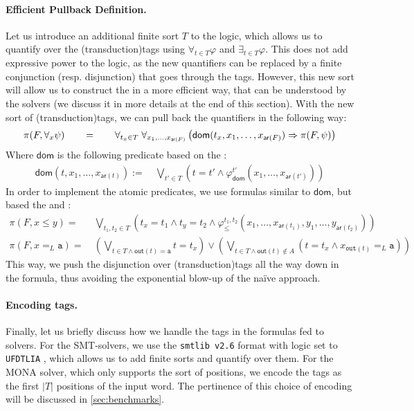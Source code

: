 \paragraph{Efficient Pullback Definition.} Let us introduce an additional
finite sort $T$ to the logic, which allows us to quantify over the \kl(transduction){tags} using
$\forall_{t \in T} \varphi$ and $\exists_{t \in T} \varphi$. This does not add
expressive power to the logic, as the new quantifiers can be replaced by a
finite conjunction (resp. disjunction) that goes through the tags. However,
this new sort will allow us to construct the  in a more
efficient way, that can be understood by the solvers (we discuss it in more
details at the end of this section). With the new sort of \kl(transduction){tags}, we can
pull back the quantifiers in the following way: 
\[ 
\begin{tabular}{ccc}
   $ \pi(F, \forall_{x} \psi)$ & $\quad = \quad$ & $\forall_{t_x \in T} \; \forall_{x_1, \ldots, x_{\mathsf{ar}(F)}} \left( {\mathsf{dom}}(t_x, x_1, \ldots, x_{\mathsf{ar}(F)}) \Rightarrow \pi(F, \psi)\right)$
\end{tabular}
\]
Where $\mathsf{dom}$ is the following predicate based on 
the :
\begin{align*}
    \mathsf{dom}(t, x_1, \ldots, x_{\mathsf{ar}(t)}) :=&~ \bigvee_{t' \in T} \left( t = t' \wedge \varphi_{\mathsf{dom}}^{t'}(x_1, \ldots, x_{\mathsf{ar}(t')}) \right)
\end{align*}
In order to implement the atomic predicates,
we use  formulas similar to $\mathsf{dom}$, but based the  and :
\begin{align*}
   \pi(F, x \leq y)  =&~ \bigvee_{t_1, t_2 \in T} \left( t_x = t_1 \wedge t_y = t_2 \wedge \varphi_{\leq}^{t_1, t_2}(x_1, \ldots, x_{\mathsf{ar}(t_1)}, y_1, \ldots, y_{\mathsf{ar}(t_2)}) \right) \\
   \pi(F, x =_L \mathtt{a}) =&~ \left(\bigvee_{t \in T \wedge \mathsf{out}(t) = \mathtt{a}} t = t_x\right) \vee
\left(\bigvee_{t \in T \wedge \mathsf{out}(t) \not \in A} (t = t_x \wedge x_{\mathtt{out}(t)} =_L \mathtt{a})\right)
\end{align*}
This way, we push the disjunction over \kl(transduction){tags} all the way down in the formula,
thus avoiding the exponential blow-up of the naïve approach.

\paragraph{Encoding tags.} Finally, let us briefly discuss how we handle the
tags in the formulas fed to solvers. For the SMT-solvers, we use the
\texttt{smtlib v2.6} format with logic set to \texttt{UFDTLIA}
\cite{BARRETT17}, which allows us to add finite sorts and quantify over them.
For the MONA solver, which only supports the sort of positions, we encode the
tags as the first $|T|$ positions of the input word. The pertinence of
this choice of encoding will be discussed in \cref{sec:benchmarks}.
